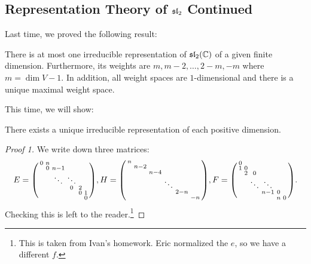 \documentclass[twoside, 10pt]{article}
\begin{document}
    \subsection{Representation Theory of $\mathfrak{sl}_2$ Continued}%
    \label{sub:representation_theory_of_sl_2_continued}
    
    Last time, we proved the following result:
    \begin{thm}
        There is at most one irreducible representation of $\mathfrak{sl}_2(\mathbb{C})$ of a given finite dimension. Furthermore, its weights are $m, m-2, \ldots, 2-m, -m$ where $m = \dim V - 1$. In addition, all weight spaces are $1$-dimensional and there is a unique maximal weight space.
    \end{thm}

    This time, we will show:
    \begin{thm}
        There exists a unique irreducible representation of each positive dimension.
    \end{thm}

    \begin{proof}[Proof 1]
        We write down three matrices:\[E = \begin{psmallmatrix}
        0 & n \\
        & 0 & n-1 \\
        & & \ddots & \ddots \\
        & & & 0 & 2 \\
        & & & & 0 & 1 \\
        & & & & & 0
    \end{psmallmatrix}, H = \begin{psmallmatrix}
        n \\
        & n-2 \\
        & & n-4 \\
        & & & \ddots \\
        & & & & 2-n \\
        & & & & & -n
    \end{psmallmatrix}, F = \begin{psmallmatrix}
        0  \\
        1 & 0 & \\
        & 2 & 0  \\
        & & \ddots & \ddots \\
        & & & n-1 & 0  \\
        & & & & n & 0
    \end{psmallmatrix}.\]
    Checking this is left to the reader.\footnote{This is taken from Ivan's homework. Eric normalized the $e$, so we have a different $f$.}
    \end{proof}
\end{document}
